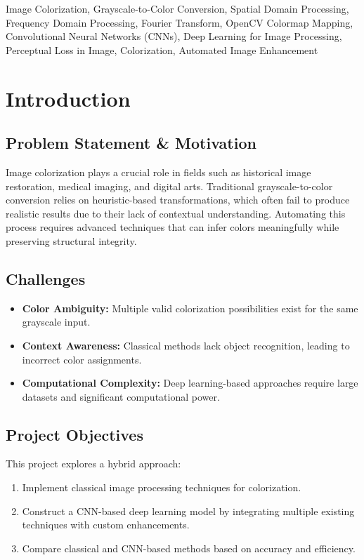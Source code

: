\documentclass[conference]{IEEEtran}
\begin{document}
\begin{IEEEkeywords}
Image Colorization, Grayscale-to-Color Conversion, Spatial Domain Processing, Frequency Domain Processing, Fourier Transform, OpenCV Colormap Mapping, Convolutional Neural Networks (CNNs), Deep Learning for Image Processing, Perceptual Loss in Image, Colorization, Automated Image Enhancement
\end{IEEEkeywords}

\section{Introduction}

\subsection{Problem Statement \& Motivation}
Image colorization plays a crucial role in fields such as historical image restoration, medical imaging, and digital arts. Traditional grayscale-to-color conversion relies on heuristic-based transformations, which often fail to produce realistic results due to their lack of contextual understanding. Automating this process requires advanced techniques that can infer colors meaningfully while preserving structural integrity.

\subsection{Challenges}
\begin{itemize}
\item \textbf{Color Ambiguity:} Multiple valid colorization possibilities exist for the same grayscale input.
\item \textbf{Context Awareness:} Classical methods lack object recognition, leading to incorrect color assignments.
\item \textbf{Computational Complexity:} Deep learning-based approaches require large datasets and significant computational power.
\end{itemize}

\subsection{Project Objectives}
This project explores a hybrid approach:
\begin{enumerate}
\item Implement classical image processing techniques for colorization.
\item Construct a CNN-based deep learning model by integrating multiple existing techniques with custom enhancements.
\item Compare classical and CNN-based methods based on accuracy and efficiency.
\end{enumerate}
\end{document}

